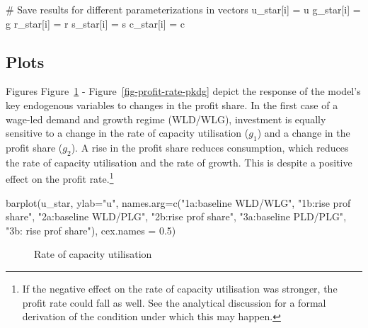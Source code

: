 \documentclass[
  letterpaper,
  DIV=11,
  numbers=noendperiod]{scrreprt}
\newenvironment{Shaded}{\begin{snugshade}}{\end{snugshade}}
\newcommand{\AttributeTok}[1]{\textcolor[rgb]{0.40,0.45,0.13}{#1}}
\newcommand{\CommentTok}[1]{\textcolor[rgb]{0.37,0.37,0.37}{#1}}
\newcommand{\FloatTok}[1]{\textcolor[rgb]{0.68,0.00,0.00}{#1}}
\newcommand{\FunctionTok}[1]{\textcolor[rgb]{0.28,0.35,0.67}{#1}}
\newcommand{\NormalTok}[1]{\textcolor[rgb]{0.00,0.23,0.31}{#1}}
\newcommand{\OperatorTok}[1]{\textcolor[rgb]{0.37,0.37,0.37}{#1}}
\newcommand{\StringTok}[1]{\textcolor[rgb]{0.13,0.47,0.30}{#1}}
\begin{document}
\begin{tcolorbox}
\begin{Shaded}
\begin{Highlighting}[]
    \CommentTok{\# Save results for different parameterizations in vectors}
\NormalTok{    u\_star[i] }\OperatorTok{=}\NormalTok{ u}
\NormalTok{    g\_star[i] }\OperatorTok{=}\NormalTok{ g}
\NormalTok{    r\_star[i] }\OperatorTok{=}\NormalTok{ r}
\NormalTok{    s\_star[i] }\OperatorTok{=}\NormalTok{ s}
\NormalTok{    c\_star[i] }\OperatorTok{=}\NormalTok{ c}
\end{Highlighting}
\end{Shaded}

\end{tcolorbox}

\subsection{Plots}\label{plots-5}

Figures Figure~\ref{fig-utilisation-pkdg} -
Figure~\ref{fig-profit-rate-pkdg} depict the response of the model's key
endogenous variables to changes in the profit share. In the first case
of a wage-led demand and growth regime (WLD/WLG), investment is equally
sensitive to a change in the rate of capacity utilisation (\(g_1\)) and
a change in the profit share (\(g_2\)). A rise in the profit share
reduces consumption, which reduces the rate of capacity utilisation and
the rate of growth. This is despite a positive effect on the profit
rate.\footnote{If the negative effect on the rate of capacity
  utilisation was stronger, the profit rate could fall as well. See the
  analytical discussion for a formal derivation of the condition under
  which this may happen.}

\begin{Shaded}
\begin{Highlighting}[]
\FunctionTok{barplot}\NormalTok{(u\_star, }\AttributeTok{ylab=}\StringTok{"u"}\NormalTok{, }\AttributeTok{names.arg=}\FunctionTok{c}\NormalTok{(}\StringTok{"1a:baseline WLD/WLG"}\NormalTok{, }\StringTok{"1b:rise prof share"}\NormalTok{, }\StringTok{"2a:baseline WLD/PLG"}\NormalTok{, }\StringTok{"2b:rise prof share"}\NormalTok{, }\StringTok{"3a:baseline PLD/PLG"}\NormalTok{, }\StringTok{"3b: rise prof share"}\NormalTok{), }\AttributeTok{cex.names =} \FloatTok{0.5}\NormalTok{)}
\end{Highlighting}
\end{Shaded}

\begin{figure}[H]


\caption{\label{fig-utilisation-pkdg}Rate of capacity utilisation}

\end{figure}%
\end{document}
